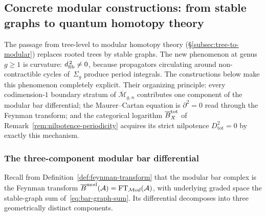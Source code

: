 \subsection{Concrete modular constructions: from stable graphs to quantum homotopy theory}
\label{subsec:concrete-modular-constructions}

The passage from tree-level to modular homotopy theory
(\S\ref{subsec:tree-to-modular}) replaces rooted trees by stable
graphs.  The new phenomenon at genus $g \geq 1$ is curvature:
$d_{\mathrm{fib}}^{\,2} \neq 0$, because propagators circulating around
non-contractible cycles of~$\Sigma_g$ produce period integrals.  The
constructions below make this phenomenon completely explicit.  Their
organizing principle: every codimension-$1$ boundary stratum of
$\overline{\mathcal{M}}_{g,n}$ contributes one component of the
modular bar differential; the Maurer--Cartan equation is $\partial^2
= 0$ read through the Feynman transform; and the categorical
logarithm $\overline{B}^{\mathrm{tot}}_X$ of
Remark~\ref{rem:nilpotence-periodicity} acquires its strict
nilpotence $D_{\mathrm{tot}}^2 = 0$ by exactly this mechanism.

\subsubsection{The three-component modular bar differential}
\label{subsubsec:three-component-differential}

Recall from Definition~\ref{def:feynman-transform} that the modular bar
complex is the Feynman transform
$\overline{B}^{\mathrm{mod}}(\mathcal{A}) = \mathrm{FT}_{\mathcal{M}od}(\mathcal{A})$,
with underlying graded space the stable-graph sum
of~\eqref{eq:bar-graph-sum}.  Its differential decomposes into three
geometrically distinct components.

